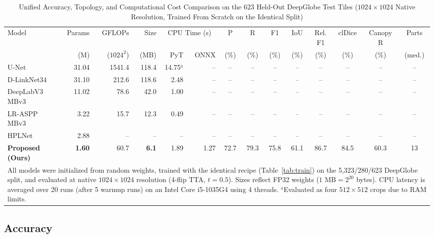 \documentclass{ieeeaccess}
\begin{document}
\begin{table}[t]
\centering
\caption{Unified Accuracy, Topology, and Computational Cost Comparison on the 623 Held-Out DeepGlobe Test Tiles ($1024 \times 1024$ Native Resolution, Trained From Scratch on the Identical Split)}
\label{tab:unified_benchmark}
\setlength{\tabcolsep}{4pt}
\renewcommand{\arraystretch}{1.15}
\tablebodyfont
\begin{tabular}{|l|r|r|r|r|r|c|c|c|c|c|c|c|c|}
\hline
Model & Params & GFLOPs & Size & \multicolumn{2}{c|}{CPU Time (s)} & P & R & F1 & IoU & Rel. F1 & clDice & Canopy R & Parts \\
\cline{5-6}
 & (M) & ($1024^2$) & (MB) & PyT & ONNX & (\%) & (\%) & (\%) & (\%) & (\%) & (\%) & (\%) & (med.) \\
\hline
U-Net~\cite{ronneberger2015unet} & 31.04 & 1541.4 & 118.4 & 14.75$^{\mathrm{a}}$ & -- & -- & -- & -- & -- & -- & -- & -- & -- \\
D-LinkNet34~\cite{zhou2018dlinknet} & 31.10 & 212.6 & 118.6 & 2.48 & -- & -- & -- & -- & -- & -- & -- & -- & -- \\
DeepLabV3 MBv3~\cite{chen2017deeplab} & 11.02 & 78.6 & 42.0 & 1.00 & -- & -- & -- & -- & -- & -- & -- & -- & -- \\
LR-ASPP MBv3~\cite{howard2019mobilenetv3} & 3.22 & 15.7 & 12.3 & 0.49 & -- & -- & -- & -- & -- & -- & -- & -- & -- \\
HPLNet~\cite{cui2025hplnet} & 2.88 & -- & -- & -- & -- & -- & -- & -- & -- & -- & -- & -- & -- \\
\textbf{Proposed (Ours)} & \textbf{1.60} & 60.7 & \textbf{6.1} & 1.89 & 1.27 & 72.7 & 79.3 & 75.8 & 61.1 & 86.7 & 84.5 & 60.3 & 13 \\
\hline
\multicolumn{14}{p{495pt}}{All models were initialized from random weights, trained with the identical recipe (Table~\ref{tab:train}) on the 5,323/280/623 DeepGlobe split, and evaluated at native $1024 \times 1024$ resolution (4-flip TTA, $t=0.5$). Sizes reflect FP32 weights ($1\text{ MB} = 2^{20}$ bytes). CPU latency is averaged over 20 runs (after 5 warmup runs) on an Intel Core i5-1035G4 using 4 threads. $^{\mathrm{a}}$Evaluated as four $512 \times 512$ crops due to RAM limits.}
\end{tabular}
\end{table}

\subsection{Accuracy}
\end{document}
